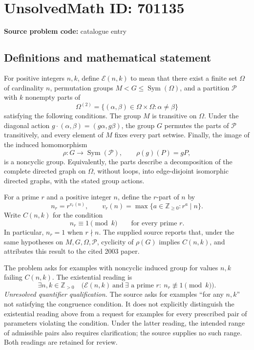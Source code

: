 \documentclass[11pt]{article}
\begin{document}
\section*{UnsolvedMath ID: 701135}
\textbf{Source problem code:} catalogue entry
\subsection{Definitions and mathematical statement}
For positive integers \(n,k\), define \(\mathcal E(n,k)\) to mean that there exist a finite set \(\Omega\) of cardinality \(n\), permutation groups \(M<G\leq\operatorname{Sym}(\Omega)\), and a partition \(\mathcal P\) with \(k\) nonempty parts of
\[
\Omega^{(2)}=\{(\alpha,\beta)\in\Omega\times\Omega:\alpha\ne\beta\}
\]
satisfying the following conditions. The group \(M\) is transitive on \(\Omega\). Under the diagonal action \(g\cdot(\alpha,\beta)=(g\alpha,g\beta)\), the group \(G\) permutes the parts of \(\mathcal P\) transitively, and every element of \(M\) fixes every part setwise. Finally, the image of the induced homomorphism
\[
\rho:G\longrightarrow\operatorname{Sym}(\mathcal P),\qquad \rho(g)(P)=gP,
\]
is a noncyclic group. Equivalently, the parts describe a decomposition of the complete directed graph on \(\Omega\), without loops, into edge-disjoint isomorphic directed graphs, with the stated group actions.

For a prime \(r\) and a positive integer \(n\), define the \(r\)-part of \(n\) by
\[
n_r=r^{v_r(n)},\qquad v_r(n)=\max\{a\in\mathbb Z_{\geq0}:r^a\mid n\}.
\]
Write \(C(n,k)\) for the condition
\[
 n_r\equiv1\pmod{k}\qquad\text{for every prime }r.
\]
In particular, \(n_r=1\) when \(r\nmid n\). The supplied source reports that, under the same hypotheses on \(M,G,\Omega,\mathcal P\), cyclicity of \(\rho(G)\) implies \(C(n,k)\), and attributes this result to the cited 2003 paper.

The problem asks for examples with noncyclic induced group for values \(n,k\) failing \(C(n,k)\). The existential reading is
\[
\exists n,k\in\mathbb Z_{>0}\quad
\bigl(\mathcal E(n,k)\ \text{and}\ \exists\text{ a prime }r:\ n_r\not\equiv1\pmod{k}\bigr).
\]
\textit{Unresolved quantifier qualification.} The source asks for examples ``for any \(n,k\)'' not satisfying the congruence condition. It does not explicitly distinguish the existential reading above from a request for examples for every prescribed pair of parameters violating the condition. Under the latter reading, the intended range of admissible pairs also requires clarification; the source supplies no such range. Both readings are retained for review.
\end{document}
